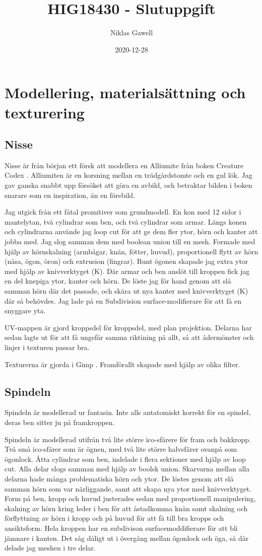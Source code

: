\documentclass{article}
\title{HIG18430 - Slutuppgift}
\date{2020-12-28}
\author{Niklas Gawell}
\begin{document}
  \maketitle
\section{Modellering, materialsättning och texturering}
\subsection{Nisse}
Nisse är från början ett försk att modellera en Alliumite från boken Creature Codex \cite{CreatureCodex}. Alliumiten är en korsning mellan en trädgårdstomte och en gul lök. Jag gav ganska snabbt upp försöket att göra en avbild, och betraktar bilden i boken  snarare som en inspiration, än en förebild.

Jag utgick från ett fåtal promitiver som grundmodell. En kon med 12 sidor i mantelytan, två cylindrar som ben, och två cylindrar som armar. Längs konen och cylindrarna använde jag loop cut för att ge dem fler ytor, hörn och kanter att jobba med. Jag slog samman dem med boolean union till en mesh. Formade med hjälp av hörnskalning (armbågar, knän, fötter, huvud), proportionell flytt av hörn (näsa, ögon, öron) och extrusion (fingrar). Runt ögonen skapade jag extra ytor med hjälp av knivverktyget (K). Där armar och ben anslöt till kroppen fick jag en del knepiga ytor, kanter och hörn. De löste jag för hand genom att slå samman hörn där det passade, och skära ut nya kanter med knivverktyget (K) där så behövdes. Jag lade på en Subdivision surface-modifierare för att få en snyggare yta. 

UV-mappen är gjord kroppsdel för kroppsdel, med plan projektion. Delarna har sedan lagts ut för att få ungefär samma riktining på allt, så att ådermönster och linjer i texturen passar bra.

Texturerna är gjorda i Gimp \cite{gimp}. Framförallt skapade med hjälp av olika filter.

\subsection{Spindeln}
Spindeln är modellerad ur fantasin. Inte alls antatomiskt korrekt för en spindel, deras ben sitter ju på framkroppen.

Spindeln är modellerad utifrån två lite större ico-sfärere för fram och bakkropp. Två små ico-sfärer som är ögnen, med två lite större halvsfärer ovanpå som ögonlock. Åtta cylindrar som ben, indelade i flera sektioner med hjälp av loop cut. Alla delar slogs samman med hjälp av boolsk union. Skarvarna mellan alla delarna hade många problematiska hörn och ytor. De löstes genom att slå samman hörn som var närliggande, samt att skapa nya ytor med knivverktyget. Form på ben, kropp och huvud justerades sedan med proportionell manipulering, skalning av hörn kring leder i ben för att åstadkomma knän samt skalning och förflyttning av hörn i kropp och på huvud för att få till bra kropps och ansiktsform. Hela kroppen har en subdivison surfacemoddifierare för att bli jämnare i kanten. Det såg dåligt ut i övergång mellan ögonlock och öga, så där delade jag meshen i tre delar.
\end{document}
